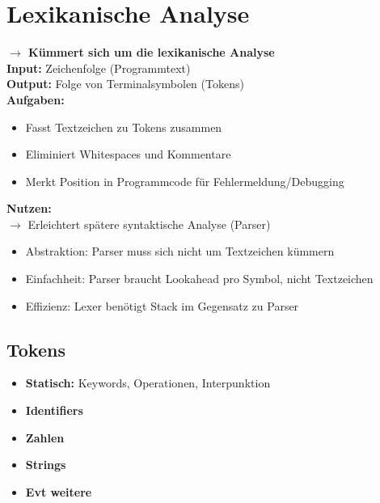 
\section{Lexikanische Analyse}
\textbf{$\rightarrow$ Kümmert sich um die lexikanische Analyse}\\
\textbf{Input:} Zeichenfolge (Programmtext)\\
\textbf{Output:} Folge von Terminalsymbolen (Tokens)\\
\textbf{Aufgaben:}
\begin{itemize}[topsep=0pt]
    \itemsep -0.2em
    \item Fasst Textzeichen zu Tokens zusammen
    \item Eliminiert Whitespaces und Kommentare
    \item Merkt Position in Programmcode für Fehlermeldung/Debugging
\end{itemize}
\textbf{Nutzen:}\\
$\rightarrow$ Erleichtert spätere syntaktische Analyse (Parser)
\begin{itemize}[topsep=0pt]
    \itemsep -0.2em
    \item Abstraktion: Parser muss sich nicht um Textzeichen kümmern
    \item Einfachheit: Parser braucht Lookahead pro Symbol, nicht Textzeichen
    \item Effizienz: Lexer benötigt Stack im Gegensatz zu Parser
\end{itemize}
\subsection{Tokens}
\begin{itemize}[topsep=0pt]
    \itemsep -0.2em
    \item \textbf{Statisch:} Keywords, Operationen, Interpunktion
    \item \textbf{Identifiers}
    \item \textbf{Zahlen}
    \item \textbf{Strings}
    \item \textbf{Evt weitere}
\end{itemize}


